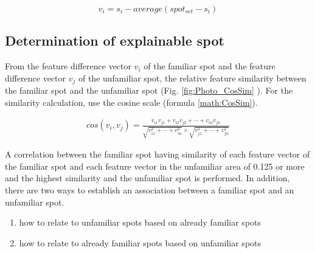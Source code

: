 \documentclass[journal]{IAENGtran}
\begin{document}
\begin{equation}
  v_i=s_i-average(spot_{set}-s_i)
  \label{math:Vector difference}
\end{equation}


\subsection{Determination of explainable spot}
\label{subsec:Determination of explainable spot}

From the feature difference vector $v_i$ of the familiar spot and the feature difference vector $v_j$ of the unfamiliar spot, the relative feature similarity between the familiar spot and the unfamiliar spot (Fig. \ref{fig:Photo_CosSim} ).
For the similarity calculation, use the cosine scale (formula \ref{math:CosSim}).

\begin{eqnarray}
  cos(v_i,v_j)=\frac{v_{i1}v_{j1}+v_{i2}v_{j2}+\cdots+v_{in}v_{jn}}{\sqrt{v^2_{i1}+\cdots+v^2_{in}}\times\sqrt{v^2_{j1}+\cdots+v^2_{jn}}}
  \label{math:CosSim}
\end{eqnarray}

A correlation between the familiar spot having similarity of each feature vector of the familiar spot and each feature vector in the unfamiliar area of 0.125 or more and the highest similarity and the unfamiliar spot is performed.
In addition, there are two ways to establish an association between a familiar spot and an unfamiliar spot.

\begin{enumerate}
  \item how to relate to unfamiliar spots based on already familiar spots
  \item how to relate to already familiar spots based on unfamiliar spots
\end{enumerate}
\end{document}
